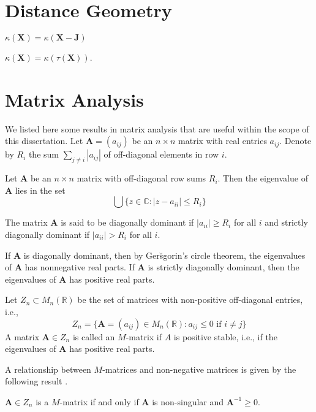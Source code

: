 \section{Distance Geometry}
\label{sec:distance-geometry}
\begin{proposition}
  \label{prop:16}
  $\kappa(\mathbf{X}) = \kappa(\mathbf{X} - \mathbf{J})$
\end{proposition}
\begin{proposition}
  \label{prop:18}
  $\kappa(\mathbf{X}) = \kappa( \tau( \mathbf{X}))$. 
\end{proposition}
\section{Matrix Analysis}
We listed here some results in matrix analysis that are useful within
the scope of this dissertation.
%
Let $\mathbf{A} = (a_{ij})$ be an $n \times n$ matrix with real
entries $a_{ij}$. Denote by $R_i$ the sum $\sum_{j \not = i}{|a_{ij}|}$ of
off-diagonal elements in row $i$. 
%
\begin{theorem}
  \label{thm:1}
  Let $\mathbf{A}$ be an $n \times n$ matrix with off-diagonal row
  sums $R_i$. Then the eigenvalue of $\mathbf{A}$ lies in the set
  \begin{equation}
    \label{eq:23}
    \bigcup \{z \in \mathbb{C} \colon |z - a_{ii}| \leq R_i \}
  \end{equation}
\end{theorem}
\begin{definition}
  \label{def:4}
  The matrix $\mathbf{A}$ is said to be diagonally dominant if
  $|a_{ii}| \geq R_i$ for all $i$ and strictly diagonally dominant if
  $|a_{ii}| > R_i$ for all $i$.
\end{definition}
If $\mathbf{A}$ is diagonally dominant, then by Ger\u{s}gorin's
circle theorem, the eigenvalues of $\mathbf{A}$ has nonnegative real
parts. If $\mathbf{A}$ is strictly diagonally dominant, then the
eigenvalues of $\mathbf{A}$ has positive real parts. 
%
\begin{definition}
  \label{def:8}
  Let $Z_n \subset M_{n}(\mathbb{R})$ be the set of matrices with
  non-positive off-diagonal entries, i.e.,
  \begin{equation}
    \label{eq:24}
    Z_n = \{ \mathbf{A} = (a_{ij}) \in M_{n}(\mathbb{R}) \colon a_{ij}
    \leq 0 \,\, \text{if $i \not = j$} \}
  \end{equation}
 A matrix $\mathbf{A} \in Z_n$ is called an $M$-matrix if $A$ is
 positive stable, i.e., if the eigenvalues of $\mathbf{A}$ has
 positive real parts.
\end{definition}
A relationship between $M$-matrices and non-negative matrices is given
by the following result \citet[\S
2.5]{horn94:_topic_in_matrix_analy}.
\begin{theorem}
  \label{thm:2}
  $\mathbf{A} \in Z_n$ is a $M$-matrix if and only if $\mathbf{A}$ is
  non-singular and $\mathbf{A}^{-1} \geq 0$.  
\end{theorem}
